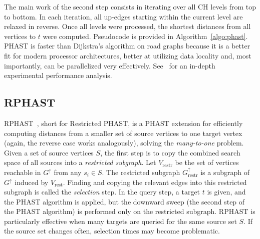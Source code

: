 \documentclass[manuscript]{acmart}
\newcommand*{\gchu}{G^{\uparrow}}
\begin{document}
The main work of the second step consists in iterating over all CH levels from top to bottom.
In each iteration, all up-edges starting within the current level are relaxed in reverse.
Once all levels were processed, the shortest distances from all vertices to $t$ were computed.
Pseudocode is provided in Algorithm~\ref{algo:phast}.
PHAST is faster than Dijkstra's algorithm on road graphs because it is a better fit for modern processor architectures, better at utilizing data locality and, most importantly, can be parallelized very effectively.
See~\cite{dgnw-phast-13} for an in-depth experimental performance analysis.


\subsection{RPHAST}

RPHAST~\cite{delling_et_al:OASIcs:2011:3266}, short for Restricted PHAST, is a PHAST extension for efficiently computing distances from a smaller set of source vertices to one target vertex (again, the reverse case works analogously), solving the \emph{many-to-one} problem.
Given a set of source vertices $S$, the first step is to copy the combined search space of all sources into a \emph{restricted subgraph}.
Let $V_{\operatorname{restr}}$ be the set of vertices reachable in $\gchu$ from any $s_i \in S$.
The restricted subgraph $\gchu_{\operatorname{restr}}$ is a subgraph of $\gchu$ induced by $V_{\operatorname{rest}}$.
Finding and copying the relevant edges into this restricted subgraph is called the \emph{selection} step.
In the query step, a target $t$ is given, and the PHAST algorithm is applied, but the downward sweep (the second step of the PHAST algorithm) is performed only on the restricted subgraph.
RPHAST is particularly effective when many targets are queried for the same source set $S$.
If the source set changes often, selection times may become problematic.
\end{document}
